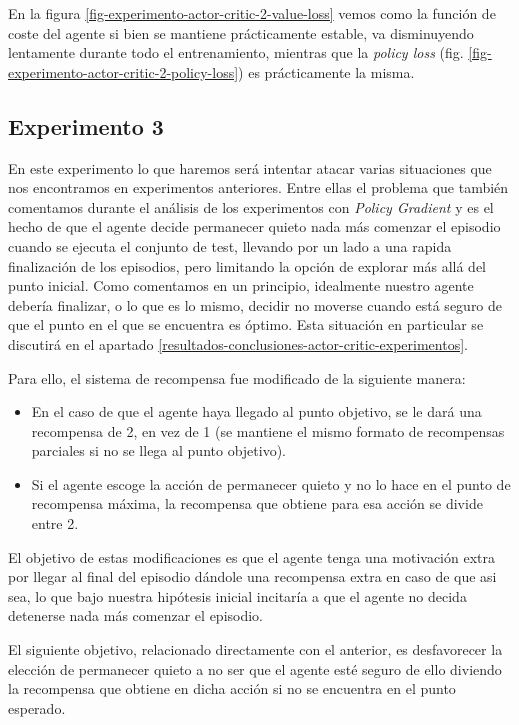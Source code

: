 En la figura \ref{fig-experimento-actor-critic-2-value-loss} vemos como la función de coste del agente si bien se mantiene prácticamente estable, va disminuyendo lentamente durante todo el entrenamiento, mientras que la \textit{policy loss} (fig. \ref{fig-experimento-actor-critic-2-policy-loss}) es prácticamente la misma.
\medskip

\subsection{Experimento 3}
\label{resultados-actor-critic-experimento-3}

En este experimento lo que haremos será intentar atacar varias situaciones que nos encontramos en experimentos anteriores. Entre ellas el problema que también comentamos durante el análisis de los experimentos con \textit{Policy Gradient} y es el hecho de que el agente decide permanecer quieto nada más comenzar el episodio cuando se ejecuta el conjunto de test, llevando por un lado a una rapida finalización de los episodios, pero limitando la opción de explorar más allá del punto inicial. Como comentamos en un principio, idealmente nuestro agente debería finalizar, o lo que es lo mismo, decidir no moverse cuando está seguro de que el punto en el que se encuentra es óptimo. Esta situación en particular se discutirá en el apartado \ref{resultados-conclusiones-actor-critic-experimentos}.
\medskip

Para ello, el sistema de recompensa fue modificado de la siguiente manera:

\begin{itemize}
	\item En el caso de que el agente haya llegado al punto objetivo, se le dará una recompensa de 2, en vez de 1 (se mantiene el mismo formato de recompensas parciales si no se llega al punto objetivo).
	\item Si el agente escoge la acción de permanecer quieto y no lo hace en el punto de recompensa máxima, la recompensa que obtiene para esa acción se divide entre 2.
\end{itemize}
\medskip

El objetivo de estas modificaciones es que el agente tenga una motivación extra por llegar al final del episodio dándole una recompensa extra en caso de que asi sea, lo que bajo nuestra hipótesis inicial incitaría a que el agente no decida detenerse nada más comenzar el episodio.
\medskip

El siguiente objetivo, relacionado directamente con el anterior, es desfavorecer la elección de permanecer quieto a no ser que el agente esté seguro de ello diviendo la recompensa que obtiene en dicha acción si no se encuentra en el punto esperado.
\medskip

